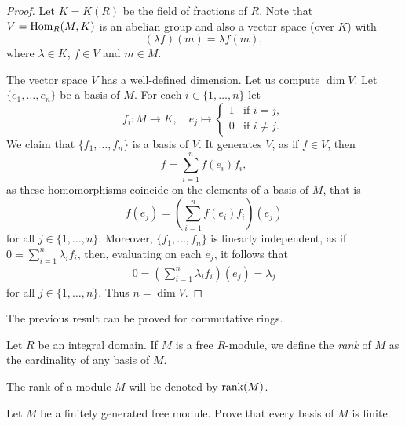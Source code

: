 \begin{proof}
Let $K=K(R)$ be the field of fractions of $R$. Note that 
$V=\operatorname{Hom}_R(M,K)$ is an abelian group and also 
a vector space (over $K$) with 
\[
(\lambda f)(m)=\lambda f(m),
\]
where $\lambda\in K$, $f\in V$ and $m\in M$.

The vector space $V$ has a well-defined dimension. 
Let us compute $\dim V$. Let $\{e_1,\dots,e_n\}$ be a basis of $M$. 
For each $i\in\{1,\dots,n\}$ let 
\[
f_i\colon M\to K,\quad
e_j\mapsto\begin{cases}
1 & \text{if $i=j$},\\
0 & \text{if $i\ne j$}.
\end{cases}
\]
We claim that $\{f_1,\dots,f_n\}$ is a basis of  $V$. It generates $V$, as  
if $f\in V$, then 
\[
f=\sum_{i=1}^n f(e_i)f_i,
\]
as these homomorphisms coincide on the elements of a basis of $M$, that is 
\[
f(e_j)=(\sum_{i=1}^n f(e_i)f_i)(e_j)
\]
for all $j\in\{1,\dots,n\}$.    
Moreover, $\{f_1,\dots,f_n\}$ is linearly independent, as if $0=\sum_{i=1}^n\lambda_if_i$, 
then, evaluating on each $e_j$, it follows that 
\begin{align*}
0=\left(\sum_{i=1}^n \lambda_if_i\right)(e_j)=\lambda_j
\end{align*}
for all $j\in\{1,\dots,n\}$. Thus $n=\dim V$. 
\end{proof}

The previous result can be proved for commutative rings. 

\begin{definition}
Let $R$ be an integral domain. If $M$ is a free $R$-module, we define the
\emph{rank} of $M$ as the cardinality of any basis of $M$.
\end{definition}

The rank of a module $M$ will be denoted by $\operatorname{rank}(M)$.   


\begin{exercise}
    \label{xca:fg+free}
    Let $M$ be a finitely generated free module. Prove that every basis of $M$
    is finite.
\end{exercise}
